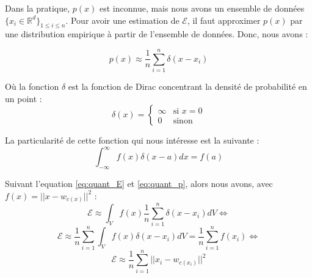 \documentclass[12pt,a4paper]{report}
\begin{document}
Dans la pratique, $p(x)$ est inconnue, mais nous avons un ensemble de données $\{x_i \in \mathbb{R}^d\}_{1 \leq i \leq n}$. Pour avoir une estimation de  $\mathcal{E}$, 
il faut approximer $p(x)$ par une distribution empirique à partir de l'ensemble de données. Donc, nous avons :

\begin{equation}
    p(x) \approx \frac{1}{n} \sum_{i=1}^{n} \delta(x - x_i)
    \label{eq:quant_p}
\end{equation}

Où la fonction $\delta$ est la fonction de Dirac concentrant la densité de probabilité en un point \cite{Dirac_wikipedia} :
$$\delta(x) =
\begin{cases}
\infty & \text{si } x = 0 \\
0 & \text{sinon}
\end{cases}
$$

La particularité de cette fonction qui nous intéresse est la suivante \cite{Dirac_wikipedia}:
$$\int_{-\infty}^{\infty} f(x) \delta(x - a) dx = f(a)$$

Suivant l'equation \eqref{eq:quant_E} et \eqref{eq:quant_p}, alors nous avons, avec $f(x) = ||x - w_{c(x)}||^2$ :
$$ \mathcal{E} \approx \int_V  f(x)\frac{1}{n} \sum_{i=1}^{n} \delta(x - x_i)dV \Leftrightarrow$$
$$ \mathcal{E} \approx \frac{1}{n} \sum_{i=1}^{n} \int_V  f(x) \delta(x - x_i)dV  =  \frac{1}{n} \sum_{i=1}^{n} f(x_i) \Leftrightarrow $$
$$ \mathcal{E} \approx \frac{1}{n} \sum_{i=1}^{n} ||x_i - w_{c(x_i)}||^2 $$
\end{document}

